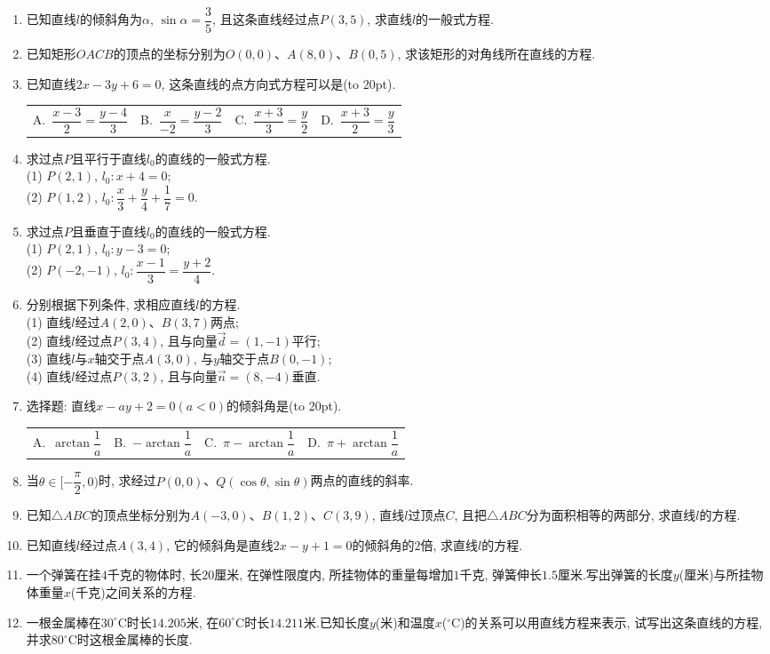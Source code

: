 \documentclass[10pt,a4paper]{article}
\newcommand{\bracket}[1]{(\hbox to #1pt{})}
\newcommand{\fourch}[4]{\par\begin{tabular}{p{.23\textwidth}p{.23\textwidth}p{.23\textwidth}p{.23\textwidth}}
A.~#1 &B.~#2& C.~#3& D.~#4
\end{tabular}}
\begin{document}
\begin{enumerate}[1.]
\item 已知直线$l$的倾斜角为$\alpha$, $\sin \alpha =\dfrac 35$, 且这条直线经过点$P(3,5)$, 求直线$l$的一般式方程.
\item 已知矩形$OACB$的顶点的坐标分别为$O(0,0)$、$A(8,0)$、$B(0,5)$, 求该矩形的对角线所在直线的方程.
\item 已知直线$2x-3y+6=0$, 这条直线的点方向式方程可以是\bracket{20}.
\fourch{$\dfrac{x-3}2=\dfrac{y-4}3$}{$\dfrac x{-2}=\dfrac{y-2}3$}{$\dfrac{x+3}3=\dfrac y2$}{$\dfrac{x+3}2=\dfrac y3$}
\item 求过点$P$且平行于直线$l_0$的直线的一般式方程.\\
(1) $P(2,1)$, $l_0:x+4=0$;\\ 
(2) $P(1,2)$, $l_0:\dfrac x3+\dfrac y4+\dfrac 17=0$.
\item 求过点$P$且垂直于直线$l_0$的直线的一般式方程.\\
(1) $P(2,1)$, $l_0:y-3=0$;\\ 
(2) $P(-2,-1)$, $l_0:\dfrac{x-1}3=\dfrac{y+2}4$.
\item 分别根据下列条件, 求相应直线$l$的方程.\\
(1) 直线$l$经过$A(2,0)$、$B(3,7)$两点;\\
(2) 直线$l$经过点$P(3,4)$, 且与向量$\overrightarrow d=(1,-1)$平行;\\
(3) 直线$l$与$x$轴交于点$A(3,0)$, 与$y$轴交于点$B(0,-1)$;\\
(4) 直线$l$经过点$P(3,2)$, 且与向量$\overrightarrow n=(8,-4)$垂直.
\item 选择题:
直线$x-ay+2=0(a<0)$的倾斜角是\bracket{20}.
\fourch{$\arctan \dfrac 1a$}{$-\arctan \dfrac 1a$}{$\pi -\arctan \dfrac 1a$}{$\pi +\arctan \dfrac 1a$}
\item 当$\theta \in [-\dfrac{\pi }2,0)$时, 求经过$P(0,0)$、$Q(\cos \theta ,\sin \theta)$两点的直线的斜率.
\item 已知$\triangle ABC$的顶点坐标分别为$A(-3,0)$、$B(1,2)$、$C(3,9)$, 直线$l$过顶点$C$, 且把$\triangle ABC$分为面积相等的两部分, 求直线$l$的方程.
\item 已知直线$l$经过点$A(3,4)$, 它的倾斜角是直线$2x-y+1=0$的倾斜角的$2$倍, 求直线$l$的方程.
\item 一个弹簧在挂$4$千克的物体时, 长$20$厘米, 在弹性限度内, 所挂物体的重量每增加$1$千克, 弹簧伸长$1.5$厘米.写出弹簧的长度$y$(厘米)与所挂物体重量$x$(千克)之间关系的方程.
\item 一根金属棒在$30^\circ\text{C}$时长$14.205$米, 在$60^\circ\text{C}$时长$14.211$米.已知长度$y$(米)和温度$x$($^\circ\text{C}$)的关系可以用直线方程来表示, 试写出这条直线的方程, 并求$80^\circ\text{C}$时这根金属棒的长度.

\end{enumerate}
\end{document}
